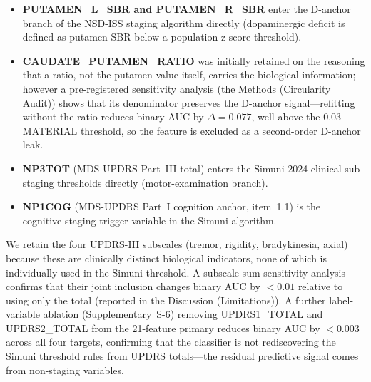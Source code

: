 \documentclass[10pt,letterpaper]{article}
\begin{document}
\begin{itemize}[leftmargin=*,itemsep=1pt,topsep=3pt]
\item \textbf{PUTAMEN\_L\_SBR and PUTAMEN\_R\_SBR} enter the D-anchor branch of the NSD-ISS staging algorithm directly (dopaminergic deficit is defined as putamen SBR below a population z-score threshold).
\item \textbf{CAUDATE\_PUTAMEN\_RATIO} was initially retained on the reasoning that a ratio, not the putamen value itself, carries the biological information; however a pre-registered sensitivity analysis (the Methods (Circularity Audit)) shows that its denominator preserves the D-anchor signal---refitting without the ratio reduces binary AUC by $\Delta{=}0.077$, well above the $0.03$ MATERIAL threshold, so the feature is excluded as a second-order D-anchor leak.
\item \textbf{NP3TOT} (MDS-UPDRS Part~III total) enters the Simuni 2024 clinical sub-staging thresholds directly (motor-examination branch).
\item \textbf{NP1COG} (MDS-UPDRS Part~I cognition anchor, item~1.1) is the cognitive-staging trigger variable in the Simuni algorithm.
\end{itemize}

We retain the four UPDRS-III subscales (tremor, rigidity, bradykinesia, axial) because these are clinically distinct biological indicators, none of which is individually used in the Simuni threshold. A subscale-sum sensitivity analysis confirms that their joint inclusion changes binary AUC by ${<}0.01$ relative to using only the total (reported in the Discussion (Limitations)). A further label-variable ablation (Supplementary~S-6) removing UPDRS1\_TOTAL and UPDRS2\_TOTAL from the 21-feature primary reduces binary AUC by ${<}0.003$ across all four targets, confirming that the classifier is not rediscovering the Simuni threshold rules from UPDRS totals---the residual predictive signal comes from non-staging variables.
\end{document}
